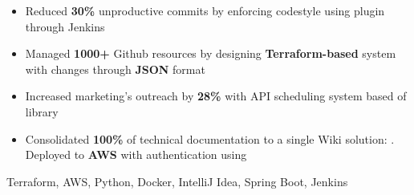 \begin{experiences}
{\begin{itemize}
                        \item Reduced \textbf{30\%} unproductive commits by enforcing codestyle using  plugin through Jenkins

                        \item Managed \textbf{1000+} Github resources by designing \textbf{Terraform-based} system with changes through \textbf{JSON} format

                        \item Increased marketing's outreach by \textbf{28\%} with API scheduling system based of  library
                        
                        \item Consolidated \textbf{100\%} of technical documentation to a single Wiki solution: . Deployed to \textbf{AWS} with authentication using 
                    \end{itemize}
                    }
                    {Terraform, AWS, Python, Docker, IntelliJ Idea, Spring Boot, Jenkins}
\end{experiences}
